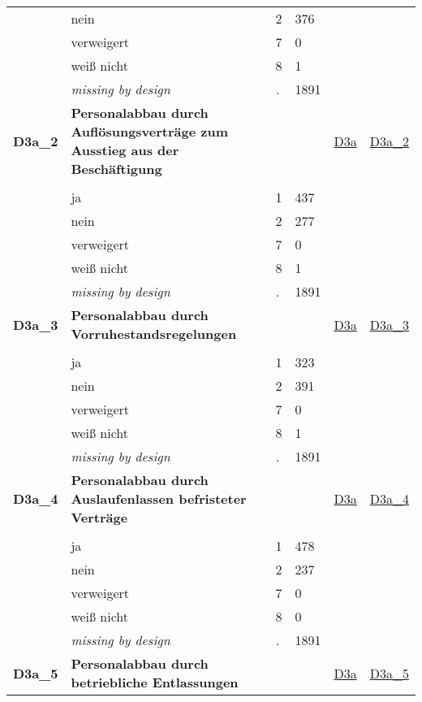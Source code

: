 \begin{longtable}{| L{2.45cm} | L{6cm} | C{1.5cm} | R{1cm} | C{2.25cm} | C{2.25cm} |}
   & nein & 2 & 376 &  &  \\ 
   & verweigert & 7 & 0 &  &  \\ 
   & weiß nicht & 8 & 1 &  &  \\ 
   & \textit{missing by design} & \textit{.} & 1891 &  &  \\ 
   \midrule
\textbf{D3a\_2}\label{var:D3a:2} & \textbf{Personalabbau durch Auflösungsverträge zum Ausstieg aus der Beschäftigung} &  &  & \hyperref[D3a]{D3a} & \hyperref[var:suf:D3a:2]{D3a\_2} \\ 
   &  &  &  &  &  \\ 
   & ja & 1 & 437 &  &  \\ 
   & nein & 2 & 277 &  &  \\ 
   & verweigert & 7 & 0 &  &  \\ 
   & weiß nicht & 8 & 1 &  &  \\ 
   & \textit{missing by design} & \textit{.} & 1891 &  &  \\ 
   \midrule
\textbf{D3a\_3}\label{var:D3a:3} & \textbf{Personalabbau durch Vorruhestandsregelungen} &  &  & \hyperref[D3a]{D3a} & \hyperref[var:suf:D3a:3]{D3a\_3} \\ 
   &  &  &  &  &  \\ 
   & ja & 1 & 323 &  &  \\ 
   & nein & 2 & 391 &  &  \\ 
   & verweigert & 7 & 0 &  &  \\ 
   & weiß nicht & 8 & 1 &  &  \\ 
   & \textit{missing by design} & \textit{.} & 1891 &  &  \\ 
   \midrule
\textbf{D3a\_4}\label{var:D3a:4} & \textbf{Personalabbau durch Auslaufenlassen befristeter Verträge} &  &  & \hyperref[D3a]{D3a} & \hyperref[var:suf:D3a:4]{D3a\_4} \\ 
   &  &  &  &  &  \\ 
   & ja & 1 & 478 &  &  \\ 
   & nein & 2 & 237 &  &  \\ 
   & verweigert & 7 & 0 &  &  \\ 
   & weiß nicht & 8 & 0 &  &  \\ 
   & \textit{missing by design} & \textit{.} & 1891 &  &  \\ 
   \midrule
\textbf{D3a\_5}\label{var:D3a:5} & \textbf{Personalabbau durch betriebliche Entlassungen} &  &  & \hyperref[D3a]{D3a} & \hyperref[var:suf:D3a:5]{D3a\_5} \\ 

\end{longtable}
